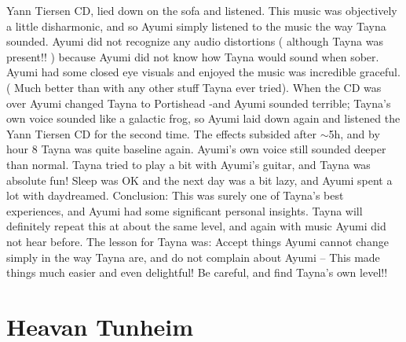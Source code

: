 \documentclass[12pt]{book}
\begin{document}
Yann Tiersen CD, lied down on the sofa and listened. This music was objectively a little disharmonic, and so Ayumi simply listened to the music the way Tayna sounded. Ayumi did not recognize any audio distortions ( although Tayna was present!! ) because Ayumi did not know how Tayna would sound when sober. Ayumi had some closed eye visuals and enjoyed the music was incredible graceful. ( Much better than with any other stuff Tayna ever tried). When the CD was over Ayumi changed Tayna to Portishead -and Ayumi sounded terrible; Tayna's own voice sounded like a galactic frog, so Ayumi laid down again and listened the Yann Tiersen CD for the second time. The effects subsided after $\sim$5h, and by hour 8 Tayna was quite baseline again. Ayumi's own voice still sounded deeper than normal. Tayna tried to play a bit with Ayumi's guitar, and Tayna was absolute fun! Sleep was OK and the next day was a bit lazy, and Ayumi spent a lot with daydreamed. Conclusion: This was surely one of Tayna's best experiences, and Ayumi had some significant personal insights. Tayna will definitely repeat this at about the same level, and again with music Ayumi did not hear before. The lesson for Tayna was: Accept things Ayumi cannot change simply in the way Tayna are, and do not complain about Ayumi -- This made things much easier and even delightful! Be careful, and find Tayna's own level!!



\chapter{Heavan Tunheim}
\end{document}
